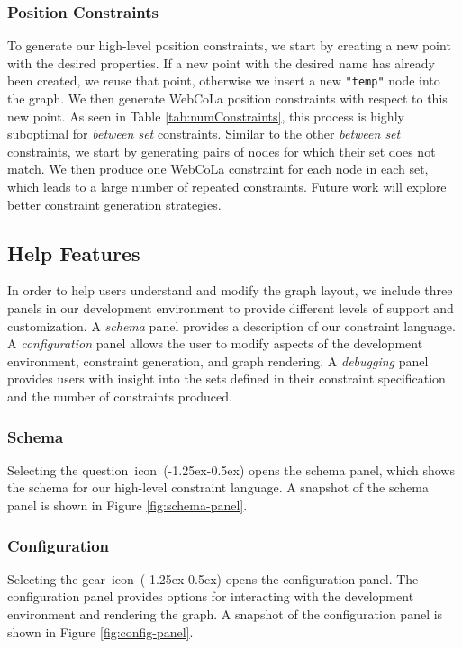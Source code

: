 {\subsubsection{Position Constraints}
To generate our high-level position constraints, we start by creating a new point with the desired properties. If a new point with the desired name has already been created, we reuse that point, otherwise we insert a new \texttt{"temp"} node into the graph. We then generate WebCoLa position constraints with respect to this new point. As seen in Table \ref{tab:numConstraints}, this process is highly suboptimal for \emph{between set} constraints. Similar to the other \emph{between set} constraints, we start by generating pairs of nodes for which their set does not match. We then produce one WebCoLa constraint for each node in each set, which leads to a large number of repeated constraints. Future work will explore better constraint generation strategies.

\subsection{Help Features}
In order to help users understand and modify the graph layout, we include three panels in our development environment to provide different levels of support and customization. A \emph{schema} panel provides a description of our constraint language. A \emph{configuration} panel allows the user to modify aspects of the development environment, constraint generation, and graph rendering. A \emph{debugging} panel provides users with insight into the sets defined in their constraint specification and the number of constraints produced. 

\subsubsection{Schema}
Selecting the \mbox{question icon (\kern-1.25ex\kern-0.5ex)} opens the schema panel, which shows the schema for our high-level constraint language. A snapshot of the schema panel is shown in Figure \ref{fig:schema-panel}.

\subsubsection{Configuration}
\schemaPanel
\configurationPanel
\debuggingPanel
Selecting the \mbox{gear icon (\kern-1.25ex\kern-0.5ex)} opens the configuration panel. The configuration panel provides options for interacting with the development environment and rendering the graph. A snapshot of the configuration panel is shown in Figure \ref{fig:config-panel}.

}
